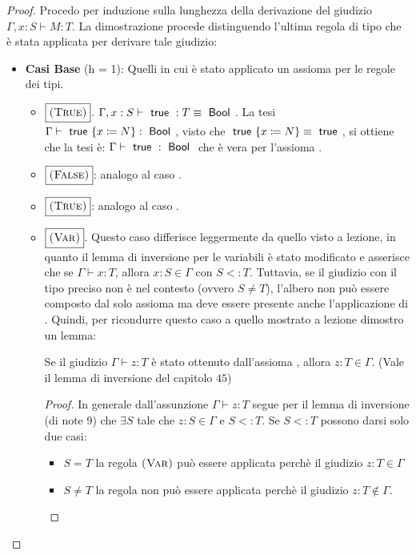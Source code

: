 \begin{proof}
Procedo per induzione sulla lunghezza della derivazione del giudizio
$\Gamma, x : S \vdash M : T$. La dimostrazione procede distinguendo l'ultima
regola di tipo che \`e stata applicata per derivare tale giudizio:
\begin{itemize}
	\item \textbf{Casi Base} (h = 1): Quelli in cui \`e stato applicato un assioma per le regole dei tipi.
	\begin{itemize}
		\item $\boxed{\textsc{(True)}}$. 
		$\Gamma, x : S \vdash \true : T \equiv \Bool$. La tesi $\Gamma \vdash \true\{x \coloneqq N\} : \Bool$, visto
		che $\true \{x \coloneqq N \} \equiv \true$, si ottiene che la tesi \`e:
		$\Gamma \vdash \true: \Bool$ che \`e vera per l'assioma .
		\item $\boxed{\textsc{(False)}}$: analogo al caso .
		\item $\boxed{}$: analogo al caso \myrule{True}.
		\item $\boxed{\textsc{(Var)}}$. Questo caso differisce leggermente da quello visto a lezione, in quanto il lemma di inversione
		per le variabili \`e stato modificato e asserisce che se $\Gamma \vdash x : T$, allora $x: S \in \Gamma$ con $S <: T$. 
		Tuttavia, se il giudizio con il tipo preciso non \`e nel contesto (ovvero $S \neq T$), l'albero non pu\`o essere composto dal solo assioma  ma
		deve essere presente anche l'applicazione di .
		Quindi, per ricondurre questo caso a quello mostrato a lezione dimostro un lemma:
		\vspace{10pt}
		
			Se il giudizio $\Gamma \vdash z : T$ \`e stato ottenuto dall'assioma , allora $z : T \in \Gamma$.
			(Vale il lemma di inversione del capitolo $45$)
			\begin{proof}
			In generale dall'assunzione $\Gamma \vdash z : T$ segue per il lemma di inversione (di note 9) che $\exists S$ tale che $z: S \in \Gamma$ e  $S <:T$. 
			Se $S <:T$ possono darsi solo due casi:
			\begin{itemize}
				\item $\boxed{S = T}$ la regola $\textsc{(Var)}$ pu\`o essere applicata perch\`e il giudizio $z : T \in \Gamma$
				\item $\boxed{S \neq T}$ la regola  non pu\`o essere applicata 
				perch\`e il giudizio $z : T \notin \Gamma$. 
			\end{itemize}
			\end{proof}
		

\end{itemize}
\end{itemize}
\end{proof}
